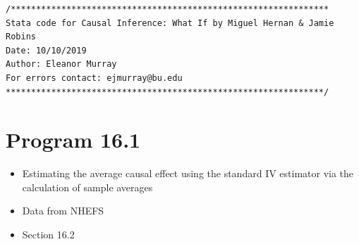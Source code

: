 \documentclass[
  10pt,
]{book}
\providecommand{\tightlist}{%
  \setlength{\itemsep}{0pt}\setlength{\parskip}{0pt}}
\begin{document}
\begin{verbatim}
/***************************************************************
Stata code for Causal Inference: What If by Miguel Hernan & Jamie Robins
Date: 10/10/2019
Author: Eleanor Murray 
For errors contact: ejmurray@bu.edu
***************************************************************/
\end{verbatim}

\hypertarget{program-16.1-1}{%
\section{Program 16.1}\label{program-16.1-1}}

\begin{itemize}
\tightlist
\item
  Estimating the average causal effect using the standard IV estimator via the calculation of sample averages
\item
  Data from NHEFS
\item
  Section 16.2
\end{itemize}
\end{document}
